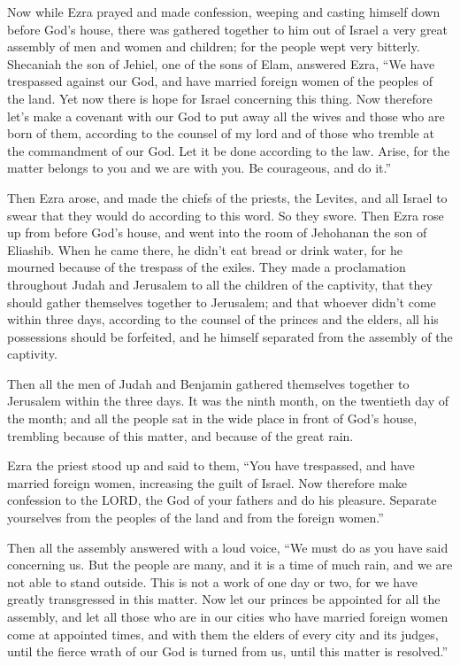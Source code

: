 \mychapter{} \myverse*{}Now while Ezra prayed and made confession, weeping and casting
himself down before God’s house, there was gathered together to him out of Israel a very great assembly
of men and women and children; for the people wept very bitterly.
\myverse{}Shecaniah the son of Jehiel, one of the sons of Elam, answered Ezra, “We have
trespassed against our God, and have married foreign women of the peoples of the land. Yet now there is
hope for Israel concerning this thing.
\myverse{}Now therefore let’s make a covenant with our God to put away all the wives
and those who are born of them, according to the counsel of my lord and of those who tremble at the commandment
of our God. Let it be done according to the law.
\myverse{}Arise, for the matter belongs to you and we are with you. Be courageous, and
do it.”

\myverse{}Then Ezra arose, and made the chiefs of the priests, the Levites,
and all Israel to swear that they would do according to this word. So they swore.
\myverse{}Then Ezra rose up from before God’s house, and went into the room of Jehohanan
the son of Eliashib. When he came there, he didn’t eat bread or drink water, for he mourned because of
the trespass of the exiles.
\myverse{}They made a proclamation throughout Judah and Jerusalem to all the children
of the captivity, that they should gather themselves together to Jerusalem;
\myverse{}and that whoever didn’t come within three days, according to the counsel of
the princes and the elders, all his possessions should be forfeited, and he himself separated from the
assembly of the captivity.

\myverse{}Then all the men of Judah and Benjamin gathered themselves together
to Jerusalem within the three days. It was the ninth month, on the twentieth day of the month; and all
the people sat in the wide place in front of God’s house, trembling because of this matter, and because
of the great rain.

\myverse{}Ezra the priest stood up and said to them, “You have trespassed,
and have married foreign women, increasing the guilt of Israel.
\myverse{}Now therefore make confession to the LORD, the God of your fathers and do
his pleasure. Separate yourselves from the peoples of the land and from the foreign women.”

\myverse{}Then all the assembly answered with a loud voice, “We must do
as you have said concerning us.
\myverse{}But the people are many, and it is a time of much rain, and we are not able
to stand outside. This is not a work of one day or two, for we have greatly transgressed in this matter.
\myverse{}Now let our princes be appointed for all the assembly, and let all those
who are in our cities who have married foreign women come at appointed times, and with them the elders
of every city and its judges, until the fierce wrath of our God is turned from us, until this matter is
resolved.”


